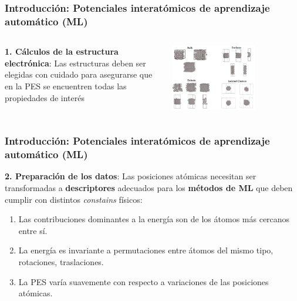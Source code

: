 \documentclass[aspectratio=169]{beamer}
\let\oldtextbf\textbf
\renewcommand{\textbf}[1]{\textcolor{nordblue}{\oldtextbf{#1}}}
\begin{document}
    \begin{frame}
        \frametitle{Introducción: Potenciales interatómicos de aprendizaje 
        automático (ML)}
        
        \begin{columns}
            \textbf{1. Cálculos de la estructura electrónica}: Las estructuras deben
            ser elegidas con cuidado para asegurarse que en la PES se encuentren 
            todas las propiedades de interés

            \begin{center}
                \includegraphics[width=0.65\textwidth]{intro-dft_data.png}
            \end{center}
        \end{columns}

    \end{frame}
    
    \begin{frame}
        \frametitle{Introducción: Potenciales interatómicos de aprendizaje 
        automático (ML)}

        \textbf{2. Preparación de los datos}: Las posiciones atómicas necesitan 
        ser transformadas a \textbf{descriptores} adecuados para los 
        \textbf{métodos de ML} que deben cumplir con distintos \textit{constains} 
        físicos:
        \begin{enumerate}
            \item Las contribuciones dominantes a la energía son de los átomos 
                más cercanos entre sí.
            \item La energía es invariante a permutaciones entre átomos del mismo 
                tipo, rotaciones, traslaciones.
            \item La PES varía suavemente con respecto a variaciones de las
                posiciones atómicas.
        \end{enumerate}

	\end{frame}
    
\end{document}

